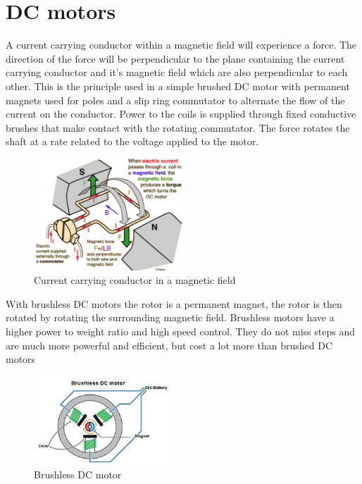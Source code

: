 \newpage
\section{DC motors}
A current carrying conductor within a magnetic field will experience a force. The direction of the force will be perpendicular to the plane containing the current carrying conductor and it's magnetic field which are also perpendicular to each other. This is the principle used in a simple brushed DC motor with permanent magnets used for poles and a slip ring commutator to alternate the flow of the current on the conductor. Power to the coils is supplied through fixed conductive brushes that make contact with the rotating commutator. The force rotates the shaft at a rate related to the voltage applied to the motor\cite{DC_Motor}.
\begin{figure}[H]
\centering
\includegraphics[width=0.5\textwidth]{lorenzforce.png}
\caption{Current carrying conductor in a magnetic field\cite{DCmotor}}
\end{figure} 
With brushless DC motors the rotor is a permanent magnet, the rotor is then rotated by rotating the surrounding magnetic field. Brushless motors have a higher power to weight ratio and high speed control. They do not miss steps and are much more powerful and efficient, but cost a lot more than brushed DC motors  \cite{brushlessDC}
\begin{figure}[H]
\centering
\includegraphics[width=0.45\textwidth]{Brushless_DC.jpeg}
\caption{Brushless DC motor \cite{brushlessDC}}
\end{figure} 


